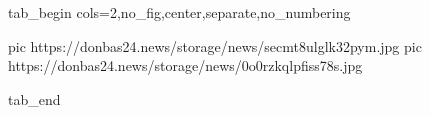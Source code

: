  
 
 
 
 

\ifcmt
  tab_begin cols=2,no_fig,center,separate,no_numbering

     pic https://donbas24.news/storage/news/secmt8ulglk32pym.jpg
     pic https://donbas24.news/storage/news/0o0rzkqlpfiss78s.jpg

  tab_end
\fi
